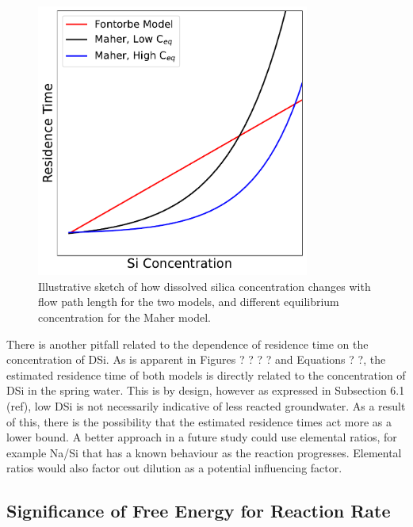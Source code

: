 \begin{figure}[h]
    \centering
    \includegraphics[width=0.8\textwidth]{Linear_vs_Exponential_Comparison.pdf}
    \caption{Illustrative sketch of how dissolved silica concentration changes with flow path length for the two models, and different equilibrium concentration for the Maher model.}
    \label{fig:comparisonceq}
\end{figure}

\FloatBarrier

There is another pitfall related to the dependence of residence time on the concentration of DSi. As is apparent in Figures ? ? ? ? and Equations ? ?, the estimated residence time of both models is directly related to the concentration of DSi in the spring water. This is by design, however as expressed in Subsection 6.1 (ref), low DSi is not necessarily indicative of less reacted groundwater. As a result of this, there is the possibility that the estimated residence times act more as a lower bound. A better approach in a future study could use elemental ratios, for example Na/Si that has a known behaviour as the reaction progresses. Elemental ratios would also factor out dilution as a potential influencing factor.



\newpage


\subsection{Significance of Free Energy for Reaction Rate}

